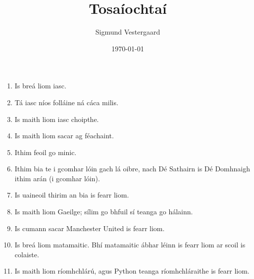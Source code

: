 \documentclass[article,a4paper,oneside,12pt]{memoir}
\title{{ \bfseries Tosaíochtaí }}
\author{Sigmund Vestergaard}
\date{\today}
\begin{document}
\maketitle

\begin{enumerate}
  \item Is breá liom iasc.
  \item Tá iasc níos folláine ná cáca milis.
  \item Is maith liom iasc choipthe.
  \item Is maith liom sacar ag f\'{e}achaint.
  \item Ithim feoil go minic.
  \item Ithim bia te i gcomhar lóin gach lá oibre, nach D\'{e} Sathairn is 
    	D\'{e} Domhnaigh ithim arán (i gcomhar lóin).
  \item Is uaineoil thirim an bia is fearr liom.
  \item Is maith liom Gaeilge; sílim go bhfuil sí teanga go hálainn.
  \item Is cumann sacar Manchester United is fearr liom.
  \item Is breá liom matamaitic. Bhí matamaitic ábhar l\'{e}inn is fearr liom 
    	ar scoil is colaiste.
  \item Is maith liom ríomhchlárú, agus Python teanga ríomhchláraithe is fearr 
    	liom.
\end{enumerate}
\end{document}
